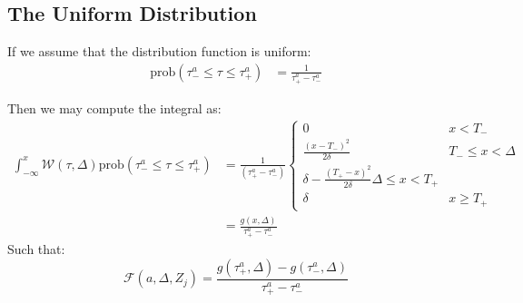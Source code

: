 \documentclass[a4paper,11pt]{article}
\begin{document}
			\subsection{The Uniform Distribution}

				If we assume that the distribution function is uniform:
				\begin{align}
					\text{prob}(\tau_-^a \leq \tau \leq \tau_+^a) & = \frac{1}{\tau_+^a - \tau_-^a}
				\end{align} 

				Then we may compute the integral as:
				\begin{align}
					\int_{-\infty}^x \mathcal{W}(\tau,\Delta) \text{prob}(\tau_-^a \leq \tau \leq \tau_+^a)  & = \frac{1}{ \left(\tau_+^a - \tau_-^a\right)}\begin{cases} 0 & x < T_-
						\\
						\frac{(x - T_-)^2}{2\delta} & T_- \leq x  < \Delta
						\\
						\delta - \frac{(T_+ - x)^2}{2\delta} \Delta \leq x < T_+
						\\
						\delta & x \geq T_+
					\end{cases}
					\\
					& = \frac{g(x,\Delta)}{\tau_+^a - \tau_-^a}
				\end{align}
				Such that:
				\begin{equation}
					\mathcal{F}(a,\Delta,Z_j)  = \frac{g(\tau_+^a,\Delta) - g(\tau_-^a,\Delta)}{\tau_+^a - \tau_-^a}
				\end{equation}
			
\end{document}
